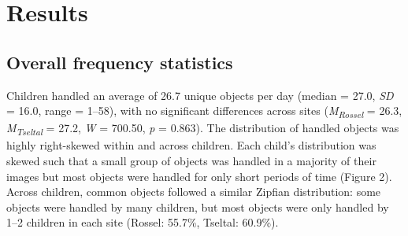 \documentclass[10pt, letterpaper]{article}
\begin{document}
\begin{table}[!ht]

\caption{\label{tab:top-objects}Number of unique objects (N) and objects handled by the most children, for each category, across sites.}
\centering
{}
\end{table}

\hypertarget{results}{%
\section{Results}\label{results}}

\hypertarget{overall-frequency-statistics}{%
\subsection{Overall frequency
statistics}\label{overall-frequency-statistics}}

Children handled an average of 26.7 unique objects per day (median =
27.0, \emph{SD} = 16.0, range = 1--58), with no significant differences
across sites (\emph{M}\textsubscript{\emph{Rossel}} = 26.3,
\emph{M}\textsubscript{\emph{Tseltal}} = 27.2, \emph{W} = 700.50,
\emph{p} = 0.863). The distribution of handled objects was highly
right-skewed within and across children. Each child's distribution was
skewed such that a small group of objects was handled in a majority of
their images but most objects were handled for only short periods of
time (Figure 2). Across children, common objects followed a similar
Zipfian distribution: some objects were handled by many children, but
most objects were only handled by 1--2 children in each site (Rossel:
55.7\%, Tseltal: 60.9\%).
\end{document}
